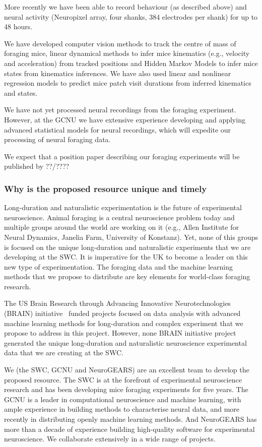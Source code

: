 More recently we have been able to record behaviour (as described above) and
neural activity (Neuropixel array, four shanks, 384 electrodes per shank) for up
to 48 hours.

We have developed computer vision methods to track the centre of mass of
foraging mice, linear dynamical methods to infer mice kinematics (e.g.,
velocity and acceleration) from tracked positions and Hidden Markov Models to
infer mice states from kinematics inferences.
%
We have also used linear and nonlinear regression models to predict mice patch
visit durations from inferred kinematics and states.

We have not yet processed neural recordings from the foraging experiment.
However, at the GCNU we have extensive experience developing and applying
advanced statistical models for neural recordings, which will expedite our
processing of neural foraging data.

We expect that a position paper describing our foraging experiments will be
published by ??/????

\subsubsection*{Why is the proposed resource unique and timely}


Long-duration and naturalistic experimentation is the future of experimental
neuroscience.  Animal foraging is a central neuroscience problem today and
multiple groups around the world are working on it (e.g., Allen Institute for
Neural Dynamics, Janelia Farm, University of Konstanz). Yet, none of this
groups is focused on the unique long-duration and naturalistic experiments that
we are developing at the SWC. It is imperative for the UK to become a leader on
this new type of experimentation. The foraging data and the machine learning
methods that we propose to distribute are key elements for world-class foraging
research.

The US Brain Research through Advancing Innovative Neurotechnologies (BRAIN)
initiative~\citep{jorgensonEtAl15} funded projects focused on data analysis
with advanced machine learning methods for long-duration and complex experiment
that we propose to address in this project. However, none BRAIN initiative
project generated the unique long-duration and naturalistic neuroscience
experimental data that we are creating at the SWC.

We (the SWC, GCNU and NeuroGEARS) are an excellent team to develop the proposed
resource. The SWC is at the forefront of experimental neuroscience research and
has been developing mice foraging experiments for five years. The GCNU is a
leader in computational neuroscience and machine learning, with ample
experience in building methods to characterise neural data, and more recently
in distributing openly machine learning methods. And NeuroGEARS has more than a
decade of experience building high-quality software for experimental
neuroscience. We collaborate extensively in a wide range of projects.

